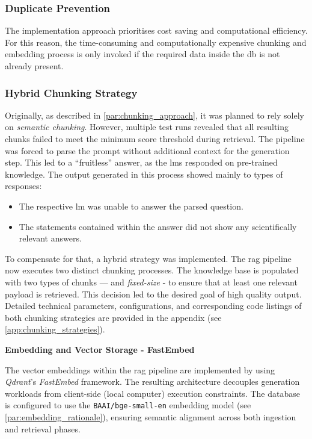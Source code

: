 \subsubsection{Duplicate Prevention}

The implementation approach prioritises cost saving and computational efficiency.
For this reason, the time-consuming and computationally expensive chunking and embedding process is only invoked if the required data inside the \ac{db} is not already present.
%
\subsubsection{Hybrid Chunking Strategy}\label{sub:hybrid_chunking_sol}
Originally, as described in \cref{par:chunking_approach}, it was planned to rely solely on \textit{semantic chunking}.
However, multiple test runs revealed that all resulting chunks failed to meet the minimum score threshold during retrieval.
The pipeline was forced to parse the prompt without additional context for the generation step.
This led to a \enquote{fruitless} answer, as the \acp{lm} responded on pre-trained knowledge.
The output generated in this process showed mainly to types of responses:
\begin{itemize}
    \item The respective \ac{lm} was unable to answer the parsed question.
    \item The statements contained within the answer did not show any scientifically relevant answers.
\end{itemize}
%
To compensate for that, a hybrid strategy was implemented.
The \ac{rag} pipeline now executes two distinct chunking processes.
The knowledge base is populated with two types of chunks —  and \textit{fixed-size} - to ensure that at least one relevant payload is retrieved.
This decision led to the desired goal of high quality output.
Detailed technical parameters, configurations, and corresponding code listings of both chunking strategies are provided in the appendix (see \cref{app:chunking_strategies}).

\noindent \textbf{Embedding and Vector Storage - FastEmbed}\label{par:embedding_workflow}

The vector embeddings within the \ac{rag} pipeline are implemented by using \textit{Qdrant}'s \textit{FastEmbed} framework.
The resulting architecture decouples generation workloads from client-side (local computer) execution constraints.
The database is configured to use the \nolinkurl{BAAI/bge-small-en} embedding model (see \cref{par:embedding_rationale}), ensuring semantic alignment across both ingestion and retrieval phases.

